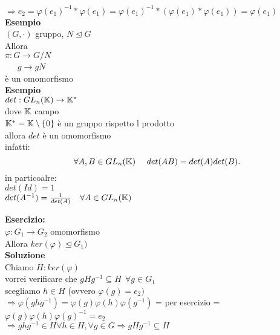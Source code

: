 \documentclass[12px]{article}
\begin{document}
{   $ \Rightarrow e_2 = \varphi(e_1)^{-1}* \varphi(e_1) = \varphi(e_1)^{-1}*( \varphi(e_1)* \varphi(e_1)) = \varphi(e_1)$ \\
   \textbf{Esempio}\\
   $(G,\cdot)$ gruppo, $N\trianglelefteq G$\\
   Allora\\
   $\pi:G \rightarrow G/N$\\
   \text{} \ \ \ $g \rightarrow gN$\\
   è un omomorfismo\\
   \textbf{Esempio}\\
   $det: GL_n (\K) \rightarrow \K^*$ \\
   dove $\K$ campo\\
    $\K^* = \K \setminus \lbrace 0 \rbrace$ è un gruppo rispetto l prodotto\\
    allora  $det$ è un omomorfismo\\
    infatti:
     \[
    \forall A,B\in GL_n(\K) \ \ \ \ det(AB) = det(A)det(B)
    .\] 
    in particoalre:\\
    $det(Id) = 1$\\
    $det(A^{-1}) = \frac 1 {det(A)} \ \ \ \forall A\in GL_n(\K)$
     \begin{defi}
    	$ \varphi: G_1 \rightarrow G_2$ omomorfismo\\
	il nucleo di $ \varphi$ è $ker( \varphi) := \lbrace g\in G_1| \varphi(g) = e\rbrace$\\
	L'immagine di $\phi$ è \\
	$Im ( \varphi) = \lbrace{h\in H_2 | \exists g\in G_1: \varphi (g) = h \rbrace$
    \end{defi}
    \textbf{Esercizio:}\\
    $\varphi: G_1 \rightarrow G_2 $ omomorfismo\\
    Allora $ker( \varphi)\trianglelefteq G_1)$\\
    \textbf{Soluzione}\\
    Chiamo $H:ker ( \varphi )$\\
    vorrei verificare che $g Hg^{-1}\subseteq H \ \ \forall g\in G_1$\\
    scegliamo $h\in H$ (ovvero $ \varphi(g) = e_2)$\\
    $ \Rightarrow  \varphi(ghg^{-1}) = \varphi(g) \varphi(h) \varphi(g^{-1})$ = per esercizio = $ \varphi(g) \varphi(h) \varphi(g)^{-1} = e_2$\\
    $ \Rightarrow ghg^{-1}\in H\forall h\in H, \forall g\in G \Rightarrow gHg^{-1}\subseteq H$\\
}
\end{document}
